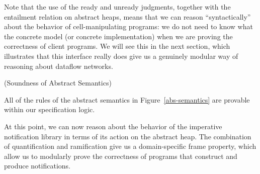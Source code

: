 Note that the use of the ready and unready judgments, together with
the entailment relation on abstract heaps, means that we can reason
``syntactically'' about the behavior of cell-manipulating programs: we
do not need to know what the concrete model (or concrete
implementation) when we are proving the correctness of client
programs. We will see this in the next section, which illustrates that
this interface really does give us a genuinely modular way of
reasoning about dataflow networks.

\begin{prop}{(Soundness of Abstract Semantics)}

All of the rules of the abstract semantics in Figure~\ref{abs-semantics} are
provable within our specification logic. 
\end{prop}

At this point, we can now reason about the behavior of the imperative
notification library in terms of its action on the abstract heap. The
combination of quantification and ramification give us a domain-specific 
frame property, which allow us to modularly prove the correctness of programs 
that construct and produce notifications.


